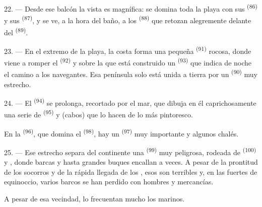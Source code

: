 22. --- Desde ese balcón la vista es magnífica: se domina toda la playa
con sus  \textsuperscript{(86)} y sus  \textsuperscript{(87)},
y se ve, a la hora del baño, a los  \textsuperscript{(88)} que
retozan alegremente delante del  \textsuperscript{(89)}.

23. --- En el extremo de la playa, la costa forma una pequeña
 \textsuperscript{(91)} rocosa, donde viene a romper el
 \textsuperscript{(92)} y sobre la que está construido un 
\textsuperscript{(93)} que indica de noche el camino a los navegantes. Esa
península solo está unida a tierra por un  \textsuperscript{(90)} muy
estrecho.

\VUsaut{3.0mm}
\VUsaut{3.0mm}

24. --- El  \textsuperscript{(94)} se prolonga, recortado por el
mar, que dibuja en él caprichosamente una serie de 
\textsuperscript{(95)} y  (cabos) que lo hacen de lo más
pintoresco.

En la  \textsuperscript{(96)}, que domina el 
\textsuperscript{(98)}, hay un  \textsuperscript{(97)} muy importante y
algunos chalés.

25. --- Ese estrecho separa del continente una  \textsuperscript{(99)}
muy peligrosa, rodeada de  \textsuperscript{(100)} y ,
donde barcas y hasta grandes buques encallan a veces. A pesar de la
prontitud de los socorros y de la rápida llegada de los , esos  son terribles y, en las fuertes
 de equinoccio, varios barcos se han perdido con
hombres y mercancías.

A pesar de esa vecindad,  lo frecuentan mucho los marinos.
\VUsaut{6.0mm}
\VUfilet{22mm}
